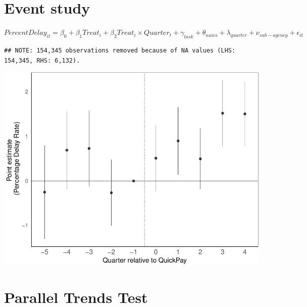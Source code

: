 \documentclass[
]{article}
\begin{document}
\hypertarget{event-study}{%
\section{Event study}\label{event-study}}

\(PercentDelay_{it}=\beta_0 + \beta_1 Treat_i + \beta_2 Treat_i \times Quarter_t + \gamma_{task} + \theta_{naics}+\lambda_{quarter}+\nu_{sub-agency}+\epsilon_{it}\)

\begin{verbatim}
## NOTE: 154,345 observations removed because of NA values (LHS: 154,345, RHS: 6,132).
\end{verbatim}

\includegraphics{qp_first_pc_delay_one_type_files/figure-latex/event_study-1.pdf}

\hypertarget{parallel-trends-test}{%
\section{Parallel Trends Test}\label{parallel-trends-test}}
\end{document}
